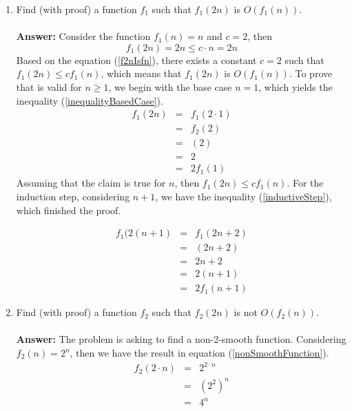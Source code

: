 \documentclass[12pt]{scrartcl}
\begin{document}
\begin{enumerate}
	\begin{enumerate}
		\item Find (with proof) a function $f_1$ such that $f_1(2n)$ is $O(f_1(n))$.\\
		\\
		\textbf{Answer:} Consider the function $f_1(n) = n$ and $c = 2$, then 
			\begin{equation}\label{f2nIsfn}
			f_1(2n) = 2n \le c \cdot n = 2n
			\end{equation}
		Based on the equation (\ref{f2nIsfn}), there exists a constant $c = 2$ such that $f_1(2n) \le c f_1(n)$, which means that $f_1(2n)$ is $O(f_1(n))$. To prove that is valid for $n \ge 1$, we begin with the base case $n = 1$, which yields the inequality (\ref{inequalityBasedCase}).
		\begin{eqnarray}\label{inequalityBasedCase}
			f_1(2n) & 	= 	& f_1(2\cdot 1)\nonumber \\
					&	=	& f_2(2) \nonumber \\
					&	=	& (2) \nonumber \\
					&	= 	& 2 \nonumber \\
					& 	=	& 2 f_1(1)
		\end{eqnarray}
		Assuming that the claim is true for $n$, then $f_1(2n) \le cf_1(n)$. For the induction step, considering $n + 1$, we have the inequality (\ref{inductiveStep}), which finished the proof.
		
		\begin{eqnarray}\label{inductiveStep}
			f_1(2(n + 1)	& 	=	&	f_1(2n + 2) \nonumber \\
							&	=	&	(2n + 2) \nonumber \\
							&	=	&	2n + 2 \nonumber \\
							&	=	&	2(n + 1) \nonumber \\
							&	=	&	2f_1(n + 1)	
		\end{eqnarray}
		
		
		
		\item Find (with proof) a function $f_2$ such that $f_2(2n)$ is not $O(f_2(n))$.\\
		\\
		\textbf{Answer:} The problem is asking to find a non-2-smooth function. Considering $f_2(n) = 2^{n}$, then we have the result in equation (\ref{nonSmoothFunction}).
		\begin{eqnarray}\label{nonSmoothFunction}
		f_2(2 \cdot n)	&	=	&	2^{2 \cdot n} \nonumber \\
						&	=	&	(2^2)^n \nonumber \\
						&	=	&	4^n
		\end{eqnarray}
		

\end{enumerate}
\end{enumerate}
\end{document}

